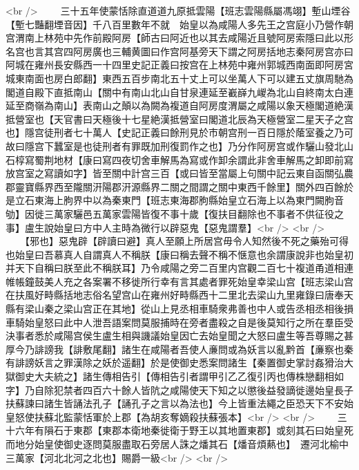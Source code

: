 <br />
　　三十五年使蒙恬除直道道九原抵雲陽【班志雲陽縣屬馮翊】塹山堙谷【塹七豔翻堙音因】千八百里數年不就　始皇以為咸陽人多先王之宫庭小乃營作朝宫渭南上林苑中先作前殿阿房【師古曰阿近也以其去咸陽近且號阿房索隱曰此以形名宫也言其宫四阿房廣也三輔黄圖曰作宫阿基旁天下謂之阿房括地志秦阿房宫亦曰阿城在雍州長安縣西一十四里史記正義曰按宫在上林苑中雍州郭城西南面即阿房宮城東南面也房白郎翻】東西五百步南北五十丈上可以坐萬人下可以建五丈旗周馳為閣道自殿下直抵南山【關中有南山北山自甘泉連延至嶻嶭九嵕為北山自終南太白連延至商嶺為南山】表南山之顛以為闕為複道自阿房度渭屬之咸陽以象天極閣道絶漢抵營室也【天官書曰天極後十七星絶漢抵營室曰閣道北辰為天極營室二星天子之宫也】隱宫徒刑者七十萬人【史記正義曰餘刑見於市朝宫刑一百日隱於䕃室養之乃可故曰隱宫下蠶室是也徒刑者有罪既加刑復罰作之也】乃分作阿房宫或作驪山發北山石椁寫蜀荆地材【康曰寫四夜切舍車解馬為寫或作卸余謂此非舍車解馬之卸即前寫放宫室之寫讀如字】皆至關中計宫三百【或曰皆至當屬上句關中記云東自函關弘農郡靈寶縣界西至隴關汧陽郡汧源縣界二關之間謂之關中東西千餘里】關外四百餘於是立石東海上朐界中以為秦東門【班志東海郡朐縣始皇立石海上以為東門闕朐音劬】因徙三萬家驪邑五萬家雲陽皆復不事十歲【復扶目翻除也不事者不供征役之事】盧生說始皇曰方中人主時為微行以辟惡鬼【惡鬼謂羣】<br />
<br />
　　【邪也】惡鬼辟【辟讀曰避】真人至願上所居宫毋令人知然後不死之藥殆可得也始皇曰吾慕真人自謂真人不稱朕【康曰稱去聲不稱不惬意也余謂康說非也始皇初并天下自稱曰朕至此不稱朕耳】乃令咸陽之旁二百里内宫觀二百七十複道甬道相連帷帳鐘鼓美人充之各案署不移徙所行幸有言其處者罪死始皇幸梁山宫【班志梁山宫在扶風好畤縣括地志俗名望宫山在雍州好畤縣西十二里北去梁山九里雍錄曰唐奉天縣有梁山秦之梁山宫正在其地】從山上見丞相車騎衆弗善也中人或告丞相丞相後損車騎始皇怒曰此中人泄吾語案問莫服捕時在旁者盡殺之自是後莫知行之所在羣臣受決事者悉於咸陽宫侯生盧生相與譏議始皇因亡去始皇聞之大怒曰盧生等吾尊賜之甚厚今乃誹謗我【誹敷尾翻】諸生在咸陽者吾使人亷問或為妖言以亂黔首【亷察也秦有誹謗妖言之罪漢除之妖於遥翻】於是使御史悉案問諸生【秦置御史掌討姦猾治大獄御史大夫統之】諸生傳相告引【傳相告引者謂甲引乙乙復引丙也傳株戀翻相如字】乃自除犯禁者四百六十餘人皆阬之咸陽使天下知之以懲後益發謫徙邊始皇長子扶蘇諫曰諸生皆誦法孔子【誦孔子之言以為法也】今上皆重法繩之臣恐天下不安始皇怒使扶蘇北監蒙恬軍於上郡【為胡亥奪嫡殺扶蘇張本】<br />
<br />
　　三十六年有隕石于東郡【東郡本衛地秦徙衛于野王以其地置東郡】或刻其石曰始皇死而地分始皇使御史逐問莫服盡取石旁居人誅之燔其石【燔音煩爇也】　遷河北榆中三萬家【河北北河之北也】賜爵一級<br />
<br />
